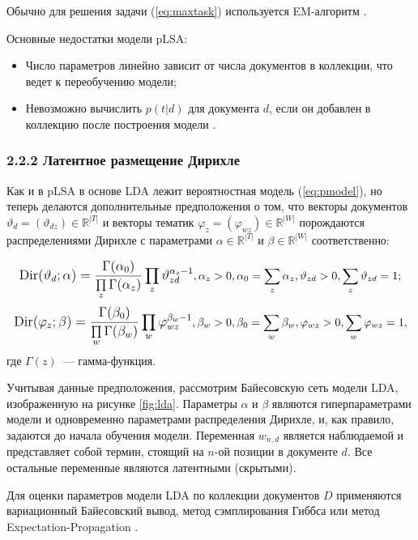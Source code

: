 \documentclass[a4paper]{report}
\begin{document}
	Обычно для решения задачи (\ref{eq:maxtask}) используется EM-алгоритм \cite{bib:Voron1}.
	
	Основные недостатки модели pLSA:
	\begin{itemize}
	\item{Число параметров линейно зависит от числа документов в коллекции, что ведет к переобучению модели;}
	\item{Невозможно вычислить $p(t|d)$ для документа $d$, если он добавлен в коллекцию после построения модели \cite{bib:Voron1}. }
	\end{itemize}
	
	
	\subsubsection{2.2.2 Латентное размещение Дирихле}
	
	Как и в pLSA в основе LDA лежит вероятностная модель (\ref{eq:pmodel}), но теперь делаются дополнительные предположения о том, что 
	векторы документов $\vartheta_d = (\vartheta_{dz}) \in \mathbb{R}^{|T|}$ 
	и 
	векторы тематик $\varphi_z = (\varphi_{wz}) \in \mathbb{R}^{|W|}$ 
	порождаются распределениями Дирихле с параметрами 
	$ \alpha \in \mathbb{R}^{|T|} $ 
	и
	$ \beta \in \mathbb{R}^{|W|} $ соответственно:
	
	$$  \mathlarger{
		\text{Dir}(\vartheta_d; \alpha) = 
		\dfrac
			{ \Gamma(\alpha_0)			}
			{ \prod \limits_z \Gamma (\alpha_z) }
		\prod_z \vartheta_{zd}^{\alpha_z - 1}
		},
		\alpha_z > 0, 
		\alpha_0 = \sum_z \alpha_z,
		\vartheta_{zd} > 0, 
		\sum_z \vartheta_{zd} = 1;		
	$$
	$$  \mathlarger{
		\text{Dir}(\varphi_z; \beta) = 
		\dfrac
			{ \Gamma(\beta_0)			}
			{ \prod \limits_w \Gamma (\beta_w) }
		\prod_w \varphi_{wz}^{\beta_w - 1}
		},
		\beta_w > 0, 
		\beta_0 = \sum_w \beta_w,
		\varphi_{wz} > 0, 
		\sum_w \varphi_{wz} = 1,	
	$$
	где $\Gamma (z) $~--- гамма-функция.
	
	Учитывая данные предположения, рассмотрим Байесовскую сеть модели LDA, изображенную на рисунке \ref{fig:lda}. Параметры $\alpha$ и $\beta$ являются гиперпараметрами модели и одновременно параметрами распределения Дирихле, и, как правило, задаются до начала обучения модели. Переменная $w_{n,d}$ является наблюдаемой и представляет собой термин, стоящий на $n$-ой позиции в документе $d$. Все остальные переменные являются латентными (скрытыми).
	
	Для оценки параметров модели LDA по коллекции документов $D$ применяются вариационный Байесовский вывод, метод сэмплирования Гиббса \cite{bib:Voron1} или метод Expectation-Propagation \cite{bib:Minka}.
	
\end{document}
